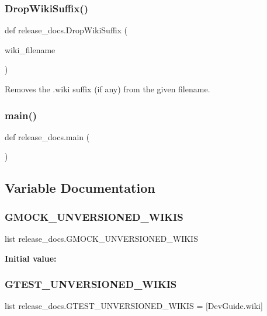 \subsubsection{\texorpdfstring{DropWikiSuffix()}{DropWikiSuffix()}}
{\footnotesize\ttfamily def release\+\_\+docs.\+Drop\+Wiki\+Suffix (\begin{DoxyParamCaption}\item[{}]{wiki\+\_\+filename }\end{DoxyParamCaption})}

\begin{DoxyVerb}Removes the .wiki suffix (if any) from the given filename.\end{DoxyVerb}
 \mbox{\label{namespacerelease__docs_ac4eb92814ebe701e3936d1bfdd2ecf73}} 
\subsubsection{\texorpdfstring{main()}{main()}}
{\footnotesize\ttfamily def release\+\_\+docs.\+main (\begin{DoxyParamCaption}{ }\end{DoxyParamCaption})}



\subsection{Variable Documentation}
\mbox{\label{namespacerelease__docs_a675f92ba4643a6aef7773a6178e49b29}} 
\subsubsection{\texorpdfstring{GMOCK\_UNVERSIONED\_WIKIS}{GMOCK\_UNVERSIONED\_WIKIS}}
{\footnotesize\ttfamily list release\+\_\+docs.\+G\+M\+O\+C\+K\+\_\+\+U\+N\+V\+E\+R\+S\+I\+O\+N\+E\+D\+\_\+\+W\+I\+K\+IS}

{\bfseries Initial value\+:}
\begin{DoxyCode}{0}
\DoxyCodeLine{1 =  [}
\DoxyCodeLine{5     ]}

\end{DoxyCode}
\mbox{\label{namespacerelease__docs_aaeabb8c74d9db7a4b2f3c66e8f1a04ee}} 
\subsubsection{\texorpdfstring{GTEST\_UNVERSIONED\_WIKIS}{GTEST\_UNVERSIONED\_WIKIS}}
{\footnotesize\ttfamily list release\+\_\+docs.\+G\+T\+E\+S\+T\+\_\+\+U\+N\+V\+E\+R\+S\+I\+O\+N\+E\+D\+\_\+\+W\+I\+K\+IS = \mbox{[}\textquotesingle{}Dev\+Guide.\+wiki\textquotesingle{}\mbox{]}}

